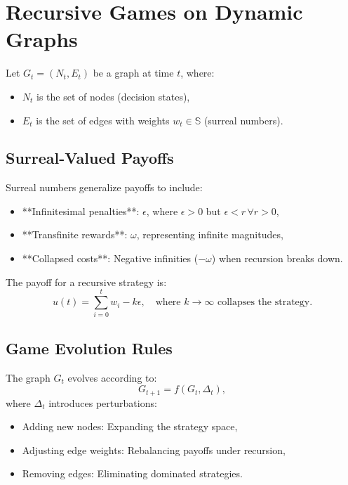 \documentclass[12pt]{article}
\begin{document}
\section{Recursive Games on Dynamic Graphs}
Let \( G_t = (N_t, E_t) \) be a graph at time \( t \), where:
\begin{itemize}
    \item \( N_t \) is the set of nodes (decision states),
    \item \( E_t \) is the set of edges with weights \( w_t \in \mathbb{S} \) (surreal numbers).
\end{itemize}

\subsection{Surreal-Valued Payoffs}
Surreal numbers generalize payoffs to include:
\begin{itemize}
    \item **Infinitesimal penalties**: \( \epsilon \), where \( \epsilon > 0 \) but \( \epsilon < r \, \forall r > 0 \),
    \item **Transfinite rewards**: \( \omega \), representing infinite magnitudes,
    \item **Collapsed costs**: Negative infinities (\(-\omega\)) when recursion breaks down.
\end{itemize}

The payoff for a recursive strategy is:
\[
u(t) = \sum_{i=0}^t w_i - k\epsilon, \quad \text{where } k \to \infty \text{ collapses the strategy.}
\]

\subsection{Game Evolution Rules}
The graph \( G_t \) evolves according to:
\[
G_{t+1} = f(G_t, \Delta_t),
\]
where \( \Delta_t \) introduces perturbations:
\begin{itemize}
    \item Adding new nodes: Expanding the strategy space,
    \item Adjusting edge weights: Rebalancing payoffs under recursion,
    \item Removing edges: Eliminating dominated strategies.
\end{itemize}
\end{document}
